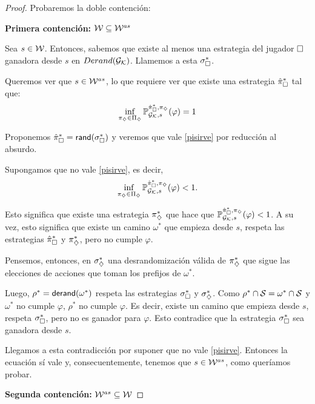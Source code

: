 \begin{proof}
	Probaremos la doble contención:

	\textbf{Primera contención: } $\mathcal{W} \subseteq \mathcal{W}^{as}$

	Sea $s \in \mathcal{W}$. Entonces, sabemos que existe al menos una estrategia del
	jugador $\square$ ganadora desde $s$ en $Derand(\mathcal{G}_{\mathcal{K}})$. Llamemos a esta
	$\sigma_\square^{*}$.

	Queremos ver que $s \in \mathcal{W}^{as}$, lo que requiere ver que existe una estrategia
	$\hat{\pi}_{\square}^{*}$ tal que:
	\begin{equation}
		\label{pisirve}
		\inf_{\pi_\diamondsuit \in \Pi_\diamondsuit} \mathbb{P}_{\mathcal{G}_{\mathcal{K}},s}^{\hat{\pi}_{\square}^{*}, \pi_\diamondsuit}(\varphi) = 1
	\end{equation}

	Proponemos $\hat{\pi}_{\square}^{*} = \textsf{rand}(\sigma_\square^*)$ y veremos que vale \ref{pisirve}
	por reducción al absurdo.

	Supongamos que no vale \ref{pisirve}, es decir,
	\begin{equation}
		\inf_{\pi_\diamondsuit \in \Pi_\diamondsuit} \mathbb{P}_{\mathcal{G}_{\mathcal{K}}, s}^{\hat{\pi}_{\square}^{*}, \pi_\diamondsuit} (\varphi) < 1.
	\end{equation}

	Esto significa que existe una estrategia $\pi_\diamondsuit^*$ que hace que $\mathbb{P}_{\mathcal{G}_{\mathcal{K}},
			s}^{\hat{\pi}_{\square}^{*}, \pi_\diamondsuit} (\varphi) < 1$. A su vez, esto significa que existe un
	camino $\omega^*$ que empieza desde $s$, respeta las estrategias $\hat{\pi}_{\square}^{*}$ y
	$\pi_\diamondsuit^*$, pero no cumple $\varphi$.

	Pensemos, entonces, en $\sigma_\diamondsuit^*$ una desrandomización válida de
	$\pi_\diamondsuit^*$ que sigue las elecciones de acciones que toman los prefijos de
	$\omega^*$.

	Luego, $\rho^* = \textsf{derand}(\omega^*)$ respeta las estrategias $\sigma_\square^*$ y
	$\sigma_\diamondsuit^*$. Como $\rho^* \cap \mathcal{S} = \omega^* \cap \mathcal{S}$ y $\omega^*$ no
	cumple $\varphi$, $\rho^*$ no cumple $\varphi$. Es decir, existe un camino que
	empieza desde $s$, respeta $\sigma_\square^*$, pero no es ganador para $\varphi$.
	Esto contradice que la estrategia $\sigma_\square^*$ sea ganadora desde $s$.

	Llegamos a esta contradicción por suponer que no vale \ref{pisirve}. Entonces
	la ecuación sí vale y, consecuentemente, tenemos que $s \in \mathcal{W}^{as}$, como
	queríamos probar.

	\textbf{Segunda contención: } $\mathcal{W}^{as} \subseteq \mathcal{W}$


\end{proof}
